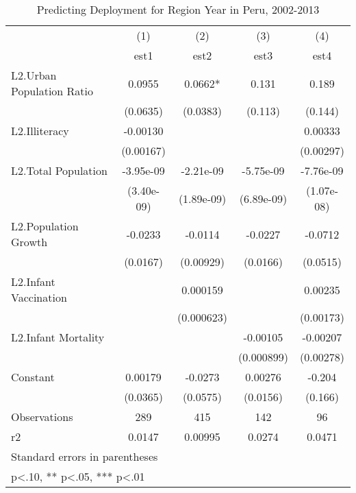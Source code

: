 \begin{table}[htbp]\centering
\def\sym#1{\ifmmode^{#1}\else\(^{#1}\)\fi}
\caption{Predicting Deployment for Region Year in Peru, 2002-2013}
\begin{tabular}{l*{4}{c}}
\hline\hline
                    &\multicolumn{1}{c}{(1)}&\multicolumn{1}{c}{(2)}&\multicolumn{1}{c}{(3)}&\multicolumn{1}{c}{(4)}\\
                    &\multicolumn{1}{c}{est1}&\multicolumn{1}{c}{est2}&\multicolumn{1}{c}{est3}&\multicolumn{1}{c}{est4}\\
\hline
L2.Urban Population Ratio&      0.0955   &      0.0662*  &       0.131   &       0.189   \\
                    &    (0.0635)   &    (0.0383)   &     (0.113)   &     (0.144)   \\
[1em]
L2.Illiteracy       &    -0.00130   &               &               &     0.00333   \\
                    &   (0.00167)   &               &               &   (0.00297)   \\
[1em]
L2.Total Population &   -3.95e-09   &   -2.21e-09   &   -5.75e-09   &   -7.76e-09   \\
                    &  (3.40e-09)   &  (1.89e-09)   &  (6.89e-09)   &  (1.07e-08)   \\
[1em]
L2.Population Growth&     -0.0233   &     -0.0114   &     -0.0227   &     -0.0712   \\
                    &    (0.0167)   &   (0.00929)   &    (0.0166)   &    (0.0515)   \\
[1em]
L2.Infant Vaccination&               &    0.000159   &               &     0.00235   \\
                    &               &  (0.000623)   &               &   (0.00173)   \\
[1em]
L2.Infant Mortality &               &               &    -0.00105   &    -0.00207   \\
                    &               &               &  (0.000899)   &   (0.00278)   \\
[1em]
Constant            &     0.00179   &     -0.0273   &     0.00276   &      -0.204   \\
                    &    (0.0365)   &    (0.0575)   &    (0.0156)   &     (0.166)   \\
\hline
Observations        &         289   &         415   &         142   &          96   \\
r2                  &      0.0147   &     0.00995   &      0.0274   &      0.0471   \\
\hline\hline
\multicolumn{5}{l}{\footnotesize Standard errors in parentheses}\\
\multicolumn{5}{l}{\footnotesize * p<.10, ** p<.05, *** p<.01}\\
\end{tabular}
\end{table}
